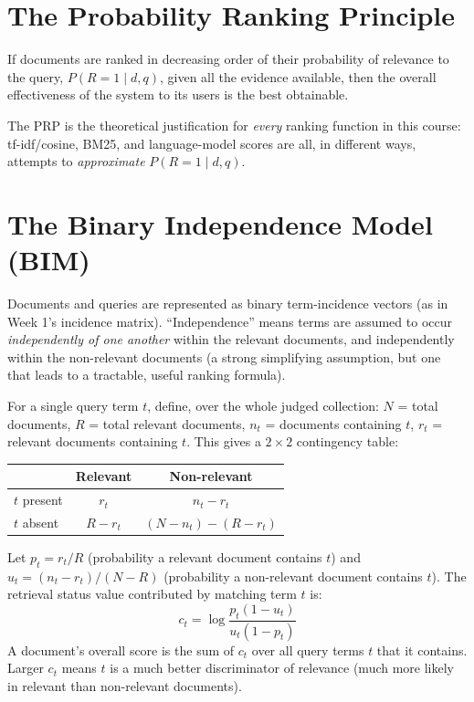 \documentclass[11pt, a4paper]{article}
\begin{document}
\section{The Probability Ranking Principle}

\begin{defbox}
If documents are ranked in decreasing order of their probability of relevance to the query, $P(R=1\mid d,q)$, given all the evidence available, then the overall effectiveness of the system to its users is the best obtainable.
\end{defbox}

The PRP is the theoretical justification for \emph{every} ranking function in this course: tf-idf/cosine, BM25, and language-model scores are all, in different ways, attempts to \emph{approximate} $P(R=1\mid d,q)$.

\section{The Binary Independence Model (BIM)}

\begin{defbox}
Documents and queries are represented as binary term-incidence vectors (as in Week 1's incidence matrix). ``Independence'' means terms are assumed to occur \emph{independently of one another} within the relevant documents, and independently within the non-relevant documents (a strong simplifying assumption, but one that leads to a tractable, useful ranking formula).
\end{defbox}

For a single query term $t$, define, over the whole judged collection: $N$ = total documents, $R$ = total relevant documents, $n_t$ = documents containing $t$, $r_t$ = relevant documents containing $t$. This gives a $2\times2$ contingency table:

\begin{center}
\begin{tabular}{@{}lcc@{}}
\toprule
 & Relevant & Non-relevant \\
\midrule
$t$ present & $r_t$ & $n_t - r_t$ \\
$t$ absent  & $R - r_t$ & $(N - n_t) - (R - r_t)$ \\
\bottomrule
\end{tabular}
\end{center}

\begin{formulabox}
Let $p_t = r_t / R$ (probability a relevant document contains $t$) and $u_t = (n_t - r_t)/(N-R)$ (probability a non-relevant document contains $t$). The retrieval status value contributed by matching term $t$ is:
\[
c_t = \log \frac{p_t(1-u_t)}{u_t(1-p_t)}
\]
A document's overall score is the sum of $c_t$ over all query terms $t$ that it contains. Larger $c_t$ means $t$ is a much better discriminator of relevance (much more likely in relevant than non-relevant documents).
\end{formulabox}
\end{document}
